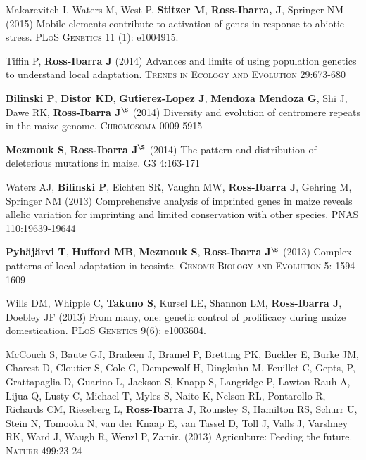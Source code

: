 \documentclass[letterpaper,10pt]{article}
\begin{document}
\begin{etaremune}
\item Makarevitch I, Waters M, West P, {\bf Stitzer M}, {\bf Ross-Ibarra, J}, Springer NM (2015) Mobile elements contribute to activation of genes in response to abiotic stress. \textsc{PLoS Genetics} 11 (1): e1004915. %


\item Tiffin P, {\bf Ross-Ibarra J} (2014) Advances and limits of using population genetics to understand local adaptation. \textsc{Trends in Ecology and Evolution} 29:673-680 %


\item {\bf Bilinski P}, {\bf Distor KD}, {\bf Gutierez-Lopez J}, {\bf Mendoza Mendoza G}, Shi J, Dawe RK,  {\bf Ross-Ibarra J}$^\S$ (2014) Diversity and evolution of centromere repeats in the maize genome. \textsc{Chromosoma} 0009-5915

\item {\bf Mezmouk S}, {\bf Ross-Ibarra J}$^\S$ (2014) The pattern and distribution of deleterious mutations in maize. \textsc{G3} 4:163-171

\item Waters AJ, {\bf Bilinski P}, Eichten SR, Vaughn MW, {\bf Ross-Ibarra J}, Gehring M, Springer NM (2013) Comprehensive analysis of imprinted genes in maize reveals allelic variation for imprinting and limited conservation with other species. \textsc{PNAS} 110:19639-19644


\item {\bf Pyh\"aj\"arvi T}, {\bf Hufford MB}, {\bf Mezmouk S}, {\bf Ross-Ibarra J}$^\S$ (2013) Complex patterns of local adaptation in teosinte. \textsc{Genome Biology and Evolution} 5: 1594-1609 %


\item Wills DM, Whipple C, {\bf Takuno S}, Kursel LE, Shannon LM, {\bf Ross-Ibarra J}, Doebley JF (2013) From many, one: genetic control of prolificacy during maize domestication. \textsc{PLoS Genetics} 9(6): e1003604. %


\item McCouch S, Baute GJ, Bradeen J, Bramel P, Bretting PK, Buckler E, Burke JM, Charest D, Cloutier S, Cole G, Dempewolf H, Dingkuhn M, Feuillet C, Gepts, P, Grattapaglia D, Guarino L, Jackson S, Knapp S, Langridge P, Lawton-Rauh A, Lijua Q, Lusty C, Michael T, Myles S, Naito K, Nelson RL, Pontarollo R, Richards CM, Rieseberg L, {\bf Ross-Ibarra J}, Rounsley S, Hamilton RS, Schurr U, Stein N, Tomooka N, van der Knaap E, van Tassel D, Toll J, Valls J, Varshney RK, Ward J, Waugh R, Wenzl P, Zamir. (2013) Agriculture: Feeding the future. \textsc{Nature} 499:23-24



\end{etaremune}
\end{document}
